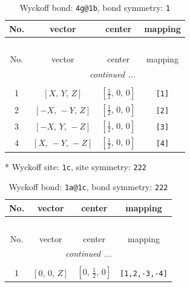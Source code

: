 \documentclass[fleqn,8pt]{jsarticle}
\begin{document}
\begin{longtable}{cccc}
\caption{Wyckoff bond: {\tt 4g@1b}, bond symmetry: {\tt 1}}
 \\
 \hline \hline
No. & vector & center & mapping \\ \hline \endfirsthead

\multicolumn{3}{l}{\tablename\ \thetable{}} \\
 \hline \hline
No. & vector & center & mapping \\ \hline \endhead

 \hline \hline
\multicolumn{3}{r}{\footnotesize\it continued ...} \\ \endfoot

 \hline \hline
\multicolumn{3}{r}{} \\ \endlastfoot

1 & $\left[ X,\, Y,\, Z \right]$ & $\left[ \frac{1}{2},\, 0,\, 0 \right]$ & {\tt [1]} \\ \hline
2 & $\left[ - X,\, - Y,\, Z \right]$ & $\left[ \frac{1}{2},\, 0,\, 0 \right]$ & {\tt [2]} \\ \hline
3 & $\left[ - X,\, Y,\, - Z \right]$ & $\left[ \frac{1}{2},\, 0,\, 0 \right]$ & {\tt [3]} \\ \hline
4 & $\left[ X,\, - Y,\, - Z \right]$ & $\left[ \frac{1}{2},\, 0,\, 0 \right]$ & {\tt [4]} \\
\end{longtable}
* Wyckoff site: {\tt 1c}, site symmetry: {\tt 222}
\renewcommand{\arraystretch}{1.2}
\begin{longtable}{cccc}
\caption{Wyckoff bond: {\tt 1a@1c}, bond symmetry: {\tt 222}}
 \\
 \hline \hline
No. & vector & center & mapping \\ \hline \endfirsthead

\multicolumn{3}{l}{\tablename\ \thetable{}} \\
 \hline \hline
No. & vector & center & mapping \\ \hline \endhead

 \hline \hline
\multicolumn{3}{r}{\footnotesize\it continued ...} \\ \endfoot

 \hline \hline
\multicolumn{3}{r}{} \\ \endlastfoot

1 & $\left[ 0,\, 0,\, Z \right]$ & $\left[ 0,\, \frac{1}{2},\, 0 \right]$ & {\tt [1,2,-3,-4]} \\
\end{longtable}
\renewcommand{\arraystretch}{1.2}
\end{document}
